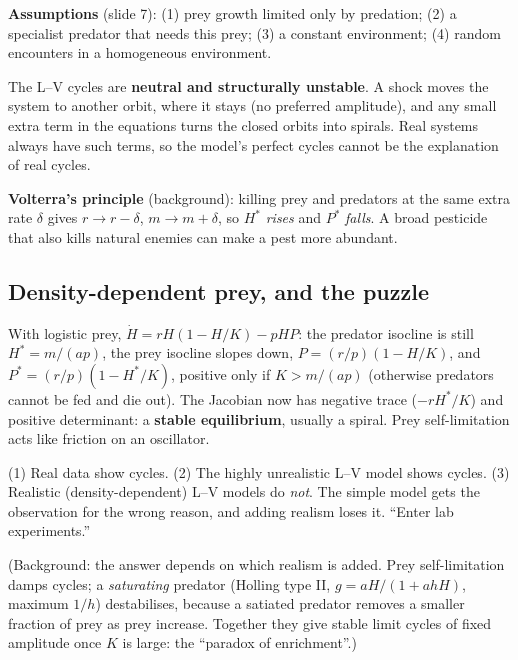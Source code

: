 \textbf{Assumptions} (slide 7): (1) prey growth limited only by predation; (2) a specialist predator that needs this
prey; (3) a constant environment; (4) random encounters in a homogeneous environment.

\begin{trap}
The L--V cycles are \textbf{neutral and structurally unstable}. A shock moves the system to another orbit, where it
stays (no preferred amplitude), and any small extra term in the equations turns the closed orbits into spirals.
Real systems always have such terms, so the model's perfect cycles cannot be the explanation of real cycles.
\end{trap}

\textbf{Volterra's principle} (background): killing prey and predators at the same extra rate $\delta$ gives
$r\to r-\delta$, $m\to m+\delta$, so $H^*$ \emph{rises} and $P^*$ \emph{falls}. A broad pesticide that also kills natural
enemies can make a pest more abundant.

\subsection{Density-dependent prey, and the puzzle}
With logistic prey, $\dot H=rH(1-H/K)-pHP$: the predator isocline is still $H^*=m/(ap)$, the prey isocline slopes down,
$P=(r/p)(1-H/K)$, and $P^*=(r/p)(1-H^*/K)$, positive only if $K>m/(ap)$ (otherwise predators cannot be fed and die out).
The Jacobian now has negative trace ($-rH^*/K$) and positive determinant: a \textbf{stable equilibrium}, usually a
spiral. Prey self-limitation acts like friction on an oscillator.

\begin{keyidea}
(1) Real data show cycles. (2) The highly unrealistic L--V model shows cycles. (3) Realistic (density-dependent)
L--V models do \emph{not}. The simple model gets the observation for the wrong reason, and adding realism loses it.
``Enter lab experiments.''
\end{keyidea}

(Background: the answer depends on which realism is added. Prey self-limitation damps cycles; a \emph{saturating}
predator (Holling type II, $g=aH/(1+ahH)$, maximum $1/h$) destabilises, because a satiated predator removes a
smaller fraction of prey as prey increase. Together they give stable limit cycles of fixed amplitude once $K$ is large:
the ``paradox of enrichment''.)

